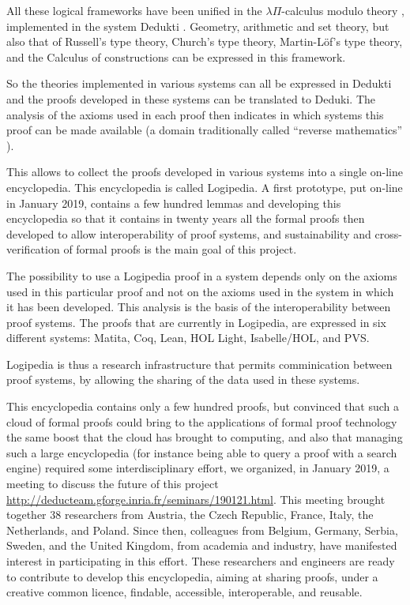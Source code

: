 All these logical frameworks have been unified in the $\lambda
\Pi$-calculus modulo theory \cite{CousineauDowek07}, implemented in
the system {\textsf Dedukti} \cite{Assaf16}.  Geometry, arithmetic and set
theory, but also that of Russell's type theory, Church's type theory,
Martin-L\"of's type theory, and the Calculus of constructions can be
expressed in this framework.

So the theories implemented in various systems can all be expressed in
{\textsf Dedukti} and the proofs developed in these systems can be
translated to {\textsf Deduki}.  The analysis of the axioms used in each
proof then indicates in which systems this proof can be made available
\cite{Thire18,Dowek17} (a domain traditionally called ``reverse
mathematics'' \cite{Friedman76,Simpson09}).

This allows to collect the proofs developed in various systems into a
single on-line encyclopedia.  This encyclopedia is called {\textsf
  Logipedia}. A first prototype, put on-line in January 2019, contains
a few hundred lemmas and developing this encyclopedia so that it
contains in twenty years all the formal proofs then developed to allow
interoperability of proof systems, and sustainability and
cross-verification of formal proofs is the main goal of this project.

The possibility to use a {\textsf Logipedia} proof in a system depends
only on the axioms used in this particular proof and not on the axioms
used in the system in which it has been developed. This analysis is
the basis of the interoperability between proof systems.  The proofs
that are currently in {\textsf Logipedia}, are expressed in six different
systems: {\textsf Matita}, {\textsf Coq}, {\textsf Lean}, {\textsf HOL Light}, {\textsf
  Isabelle/HOL}, and {\textsf PVS}.

{\textsf Logipedia} is thus a research infrastructure that permits
comminication between proof systems, by allowing the sharing of the
data used in these systems.


This encyclopedia contains only a few hundred proofs, but convinced
that such a cloud of formal proofs could bring to the applications of
formal proof technology the same boost that the cloud has brought to
computing, and also that managing such a large encyclopedia (for
instance being able to query a proof with a search engine) required
some interdisciplinary effort, we organized, in January 2019, a
meeting to discuss the future of this project
\url{http://deducteam.gforge.inria.fr/seminars/190121.html}.  This
meeting brought together 38 researchers from Austria, the Czech
Republic, France, Italy, the Netherlands, and Poland.  Since then,
colleagues from Belgium, Germany, Serbia, Sweden, and the United
Kingdom, from academia and industry, have manifested interest in
participating in this effort.  These researchers and engineers are
ready to contribute to develop this encyclopedia, aiming at sharing
proofs, under a creative common licence, findable, accessible,
interoperable, and reusable.

